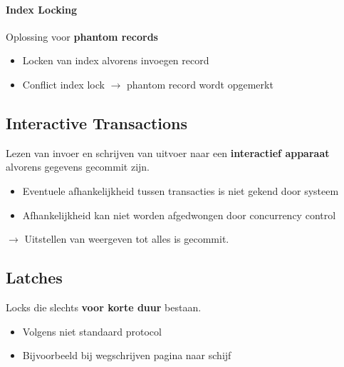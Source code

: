 \paragraph{Index Locking} Oplossing voor \textbf{phantom records}
\begin{itemize}
	\item Locken van index alvorens invoegen record
	\item Conflict index lock $\rightarrow$ phantom record wordt opgemerkt
\end{itemize}


\subsection{Interactive Transactions}%
Lezen van invoer en schrijven van uitvoer naar een \textbf{interactief apparaat} alvorens gegevens gecommit zijn.
\begin{itemize}
	\item Eventuele afhankelijkheid tussen transacties is niet gekend door systeem
	\item Afhankelijkheid kan niet worden afgedwongen door concurrency control
\end{itemize}
$\rightarrow$ Uitstellen van weergeven tot alles is gecommit.


\subsection{Latches}%
Locks die slechts \textbf{voor korte duur} bestaan.
\begin{itemize}
	\item Volgens niet standaard protocol	
	\item Bijvoorbeeld bij wegschrijven pagina naar schijf
\end{itemize}